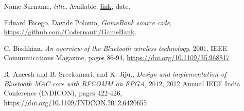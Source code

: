 %
%
%
\begin{thebibliography}{1}

  Name Surname,
  \emph{title},
  Available: \url{link},
  date.
  
  Eduard Bicego, Davide Polonio,
  \emph{GameBank source code},
  \url{https://github.com/Codernauti/GameBank}.
  
  C. Bisdikian,
  \emph{An overview of the Bluetooth wireless technology},
  2001,
  IEEE Communications Magazine, pages 86-94,
  \url{https://doi.org/10.1109/35.968817}

  R. Aneesh and B. Sreekumari. and K. Jiju.,
  \emph{Design and implementation of Bluetooth MAC core with RFCOMM on FPGA},
  2012,
  2012 Annual IEEE India Conference (INDICON), pages 422-426,
  \url{https://doi.org/10.1109/INDCON.2012.6420655}

\end{thebibliography}

